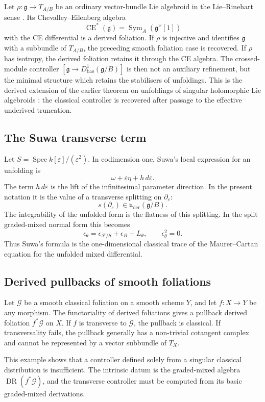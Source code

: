 \documentclass[11pt,reqno,a4paper,dvipsnames,x11names]{amsart}
\numberwithin{equation}{section}
\theoremstyle{plain}
\theoremstyle{definition}
\theoremstyle{remark}
\DeclareMathOperator{\Spec}{Spec}
\DeclareMathOperator{\Sym}{Sym}
\DeclareMathOperator{\CE}{CE}
\DeclareMathOperator{\DR}{DR}
\newcommand{\kk}{k}
\newcommand{\cF}{\mathcal F}
\newcommand{\cG}{\mathcal G}
\newcommand{\g}{\mathfrak g}
\newcommand{\uuder}{\mathfrak u_{\mathrm{der}}}
\newcommand{\eps}{\varepsilon}
\newcommand{\bas}{\mathrm{bas}}
\newcommand{\from}{\colon}
\begin{document}
Let \(\rho\from\g\to T_{A/B}\) be an ordinary vector-bundle Lie algebroid in the Lie--Rinehart sense \cite{Rinehart63}. Its Chevalley--Eilenberg algebra
\[
 \CE^*(\g)=\Sym_A(\g^\vee[1])
\]
with the CE differential is a derived foliation. If \(\rho\) is injective and identifies \(\g\) with a subbundle of \(T_{A/B}\), the preceding smooth foliation case is recovered. If \(\rho\) has isotropy, the derived foliation retains it through the CE algebra. The crossed-module controller \([\g\to D^1_{\bas}(\g/B)]\) is then not an auxiliary refinement, but the minimal structure which retains the stabilisers of unfoldings.
This is the derived extension of the earlier theorem on unfoldings of singular holomorphic Lie algebroids \cite{CMQ}: the classical controller is recovered after passage to the effective underived truncation.

\subsection{The Suwa transverse term}

Let \(S=\Spec \kk[\eps]/(\eps^2)\). In codimension one, Suwa's local expression for an unfolding \cite{Suwa81,Suwa83} is
\[
 \omega+\eps\eta+h\,d\eps.
\]
The term \(h\,d\eps\) is the lift of the infinitesimal parameter direction. In the present notation it is the value of a transverse splitting on \(\partial_\eps\):
\[
 s(\partial_\eps)\in \uuder(\g/B).
\]
The integrability of the unfolded form is the flatness of this splitting. In the split graded-mixed normal form this becomes
\[
 \epsilon_\theta=\epsilon_{\cF/S}+\epsilon_B+L_\theta,
 \qquad
 \epsilon_\theta^2=0.
\]
Thus Suwa's formula is the one-dimensional classical trace of the Maurer--Cartan equation for the unfolded mixed differential.

\subsection{Derived pullbacks of smooth foliations}

Let \(\cG\) be a smooth classical foliation on a smooth scheme \(Y\), and let \(f\from X\to Y\) be any morphism. The functoriality of derived foliations \cite[Section~2.1]{TV} gives a pullback derived foliation \(f^*\cG\) on \(X\). If \(f\) is transverse to \(\cG\), the pullback is classical. If transversality fails, the pullback generally has a non-trivial cotangent complex and cannot be represented by a vector subbundle of \(T_X\).

This example shows that a controller defined solely from a singular classical distribution is insufficient. The intrinsic datum is the graded-mixed algebra \(\DR(f^*\cG)\), and the transverse controller must be computed from its basic graded-mixed derivations.
\end{document}
